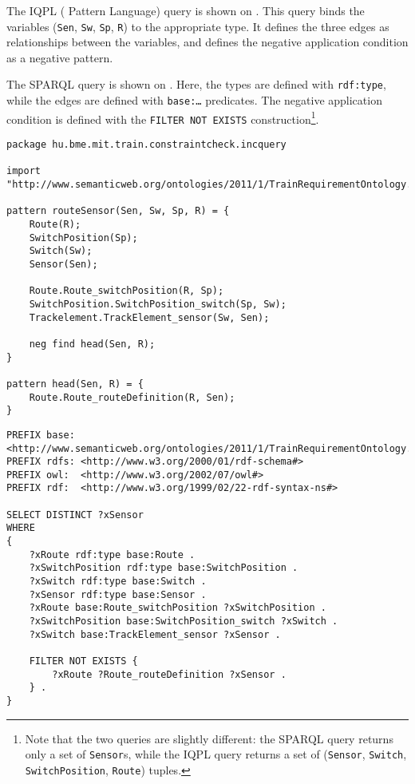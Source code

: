 The IQPL (\iq{} Pattern Language) query %
is shown on . This query binds the variables (\texttt{Sen}, \texttt{Sw}, \texttt{Sp}, \texttt{R}) to the appropriate type. It defines the three edges as relationships between the variables, and defines the negative application condition as a negative pattern.

The SPARQL query is shown on . Here, the types are defined with \texttt{rdf:type}, while the edges are defined with \texttt{base:\ldots} predicates. The negative application condition is defined with the \texttt{FILTER NOT EXISTS} construction\footnote{Note that the two queries are slightly different: the SPARQL query returns only a set of \texttt{Sensor}s, while the IQPL query returns a set of (\texttt{Sensor}, \texttt{Switch}, \texttt{SwitchPosition}, \texttt{Route}) tuples.}.

\lstset{language=viatra}

\begin{lstlisting}[caption=The RouteSensor query in IQPL, label=lst:routesensor-iqpl]
package hu.bme.mit.train.constraintcheck.incquery

import "http://www.semanticweb.org/ontologies/2011/1/TrainRequirementOntology.owl" 

pattern routeSensor(Sen, Sw, Sp, R) = {
	Route(R);
	SwitchPosition(Sp);
	Switch(Sw);
	Sensor(Sen);
	
	Route.Route_switchPosition(R, Sp);
	SwitchPosition.SwitchPosition_switch(Sp, Sw);
	Trackelement.TrackElement_sensor(Sw, Sen);
	
	neg find head(Sen, R);	
}

pattern head(Sen, R) = {
	Route.Route_routeDefinition(R, Sen);
}
\end{lstlisting}



\begin{lstlisting}[caption=The RouteSensor query in SPARQL, label=lst:routesensor-sparql]
PREFIX base: <http://www.semanticweb.org/ontologies/2011/1/TrainRequirementOntology.owl#>
PREFIX rdfs: <http://www.w3.org/2000/01/rdf-schema#>
PREFIX owl:  <http://www.w3.org/2002/07/owl#>
PREFIX rdf:  <http://www.w3.org/1999/02/22-rdf-syntax-ns#>

SELECT DISTINCT ?xSensor
WHERE
{
    ?xRoute rdf:type base:Route .
    ?xSwitchPosition rdf:type base:SwitchPosition .
    ?xSwitch rdf:type base:Switch .
    ?xSensor rdf:type base:Sensor .
    ?xRoute base:Route_switchPosition ?xSwitchPosition .
    ?xSwitchPosition base:SwitchPosition_switch ?xSwitch .
    ?xSwitch base:TrackElement_sensor ?xSensor .

    FILTER NOT EXISTS {
        ?xRoute ?Route_routeDefinition ?xSensor .
    } .
}
\end{lstlisting}


